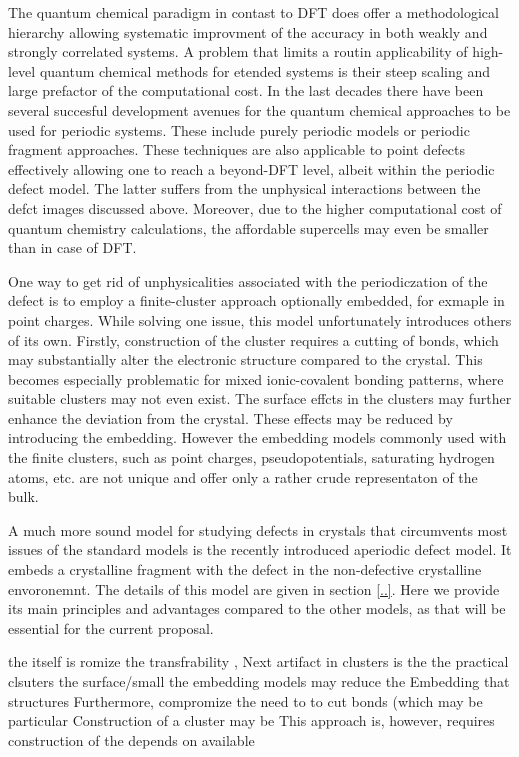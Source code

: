 \documentclass[a4paper,11pt,headings=normal]{scrartcl}
\begin{document}
The quantum chemical paradigm in contast to DFT does offer a methodological hierarchy allowing systematic improvment of the accuracy in both weakly and strongly correlated systems. A problem that limits a routin applicability of high-level quantum chemical methods for etended systems is their steep scaling and large prefactor of the computational cost. In the last decades there have been several succesful development avenues for the quantum chemical approaches to be used for periodic systems. These include purely periodic models\cite{..} or periodic fragment approaches.\cite{..} These techniques are also applicable to point defects effectively allowing one to reach a beyond-DFT level, albeit within the periodic defect model. The latter suffers from the unphysical interactions between the defct images discussed above. Moreover, due to the higher computational cost of quantum chemistry calculations, the affordable supercells may even be smaller than in case of DFT.

One way to get rid of unphysicalities associated with the periodiczation of the defect is to employ a finite-cluster approach\cite{..} optionally embedded, for exmaple in point charges.\cite{..} While solving one issue, this model unfortunately introduces others of its own. Firstly, construction of the cluster requires a cutting of bonds, which may substantially alter the electronic structure compared to the crystal. This becomes especially problematic for mixed ionic-covalent bonding patterns, where suitable clusters may not even exist. The surface effcts in the clusters may further enhance the deviation from the crystal. These effects may be reduced by introducing the embedding. However the embedding models commonly used with the finite clusters, such as point charges, pseudopotentials, saturating hydrogen atoms, etc. are not unique and offer only a rather crude representaton of the bulk.\cite{..}

A much more sound model for studying defects in crystals that circumvents most issues of the standard models is the recently introduced aperiodic defect model. It embeds a crystalline fragment with the defect in the non-defective crystalline envoronemnt. The details of this model are given in section \ref{..}. Here we provide its main principles and advantages compared to the other models, as that will be essential for the current proposal.




the itself is romize the transfrability ,  Next artifact in clusters is the the practical clsuters the surface/small  the embedding models may reduce the  Embedding that   structures Furthermore, compromize the   need to to cut bonds (which may be particular Construction of a cluster may be This approach is, however, requires construction of the depends on available 
\end{document}
